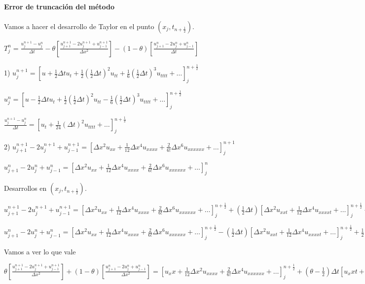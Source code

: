 \paragraph*{Error de truncación del método}
Vamos a hacer el desarrollo de Taylor en el punto $(x_j, t_{n+\frac{1}{2}})$.

$T_j^n = \frac{u_{j}^{n+1} - u_{j}^{n}}{\Delta t} - \theta\left[\frac{u_{j+1}^{n+1}-2u_{j}^{n+1}+u_{j-1}^{n+1}}{\Delta x ^2}\right] - (1-\theta)\left[\frac{u_{j+1}^{n}-2u_{j}^{n}+u_{j-1}^{n}}{\Delta t}\right]$

1) $u_{j}^{n+1} = \left[u + \frac{1}{2}\Delta tu_t + \frac{1}{2}(\frac{1}{2}\Delta t)^2u_{tt} + \frac{1}{6}(\frac{1}{2}\Delta t)^3u_{tttt} + \hdots \right]_j^{n+\frac{1}{2}}$

$u_{j}^{n} = \left[u - \frac{1}{2}\Delta tu_t + \frac{1}{2}(\frac{1}{2}\Delta t)^2u_{tt} - \frac{1}{6}(\frac{1}{2}\Delta t)^3u_{tttt} + \hdots \right]_j^{n+\frac{1}{2}}$


$\frac{u_j^{n+1}-u_j^n}{\Delta t} = \left[u_t+\frac{1}{24}(\Delta t)^2u_{tttt}+\hdots \right]_j^{n+\frac{1}{2}}$

2) $u_{j+1}^{n+1} -2u_{j}^{n+1} + u_{j-1}^{n+1} = \left[\Delta x ^2 u_{xx} + \frac{1}{12}\Delta x ^4 u_{xxxx} + \frac{2}{6!}\Delta x ^6 u_{xxxxxx}+\hdots \right]_j^{n+1}$

$u_{j+1}^{n} -2u_{j}^{n} + u_{j-1}^{n} = \left[\Delta x ^2 u_{xx} + \frac{1}{12}\Delta x ^4 u_{xxxx} + \frac{2}{6!}\Delta x ^6 u_{xxxxxx}+\hdots \right]_j^{n}$

Desarrollos en $(x_j, t_{n+\frac{1}{2}})$.

$u_{j+1}^{n+1} -2u_{j}^{n+1} + u_{j-1}^{n+1} = \left[\Delta x ^2 u_{xx} + \frac{1}{12}\Delta x ^4 u_{xxxx} + \frac{2}{6!}\Delta x^6 u_{xxxxxx}+\hdots \right]_j^{n+\frac{1}{2}}
+ (\frac{1}{2}\Delta t) \left[\Delta x ^2 u_{xxt} + \frac{1}{12}\Delta x ^4 u_{xxxxt} +\hdots \right]_j^{n+\frac{1}{2}}
+ \frac{1}{2}(\frac{1}{2}\Delta t)^2 \left[\Delta x ^2 u_{xxtt} + \hdots \right]_j^{n+\frac{1}{2}}$

$u_{j+1}^{n} -2u_{j}^{n} + u_{j-1}^{n} = \left[\Delta x ^2 u_{xx} + \frac{1}{12}\Delta x ^4 u_{xxxx} + \frac{2}{6!}\Delta x^6 u_{xxxxxx}+\hdots \right]_j^{n+\frac{1}{2}}
- (\frac{1}{2}\Delta t) \left[\Delta x ^2 u_{xxt} + \frac{1}{12}\Delta x ^4 u_{xxxxt} +\hdots \right]_j^{n+\frac{1}{2}}
+ \frac{1}{2}(\frac{1}{2}\Delta t)^2 \left[\Delta x ^2 u_{xxtt} + \hdots \right]_j^{n+\frac{1}{2}}$

Vamos a ver lo que vale

$\theta\left[\frac{u_{j+1}^{n+1}-2u_{j}^{n+1}+u_{j-1}^{n+1}}{\Delta x ^2}\right] + (1 - \theta) \left[\frac{u_{j+1}^{n}-2u_{j}^{n}+u_{j-1}^{n}}{\Delta x ^2}\right]
= \left[u_xx + \frac{1}{12}\Delta x^2 u_{xxxx} + \frac{2}{6!}\Delta x ^4 u_{xxxxxx}  + \hdots\right]_j^{n+\frac{1}{2}} 
+(\theta - \frac{1}{2})\Delta t \left[u_xxt + \frac{1}{12}\Delta x ^2 u_{xxxx}\right]_j^{n+\frac{1}{2}}
+\frac{1}{8}\Delta t ^2\left[u_{xxtt}\right]_j^{n+\frac{1}{2}}
$

